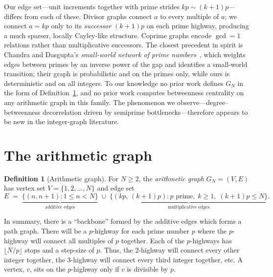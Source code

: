 \documentclass[11pt]{article}
\theoremstyle{plain}
\theoremstyle{definition}
\newtheorem{definition}[theorem]{Definition}
\begin{document}
Our edge set---unit increments together with prime strides $kp \sim (k+1)p$---differs from each of these.
Divisor graphs connect $a$ to every multiple of $a$; we connect $a = kp$ only to its
\emph{successor} $(k+1)p$ on each prime highway, producing a much sparser, locally Cayley-like structure.
Coprime graphs encode $\gcd = 1$ relations rather than multiplicative successors. The closest precedent in spirit
is Chandra and Dasgupta's \emph{small-world network of prime numbers}~\cite{ChandraDasgupta2005}, which weights edges between primes
by an inverse power of the gap and identifies a small-world transition; their graph is probabilistic and on
the primes only, while ours is deterministic and on all integers. To our knowledge no prior work
defines $G_N$ in the form of Definition~\ref{def:graph}, and no prior work computes betweenness centrality
on any arithmetic graph in this family. The phenomenon we observe---degree--betweenness decorrelation
driven by semiprime bottlenecks---therefore appears to be new in the integer-graph literature.

\section{The arithmetic graph}

\begin{definition}[Arithmetic graph]\label{def:graph}
For $N \ge 2$, the \emph{arithmetic graph} $G_N = (V, E)$ has vertex set
$V = \{1, 2, \ldots, N\}$ and edge set
\begin{equation}\label{eq:edgeset}
E \;=\; \underbrace{\{(n, n+1) : 1 \le n < N\}}_{\text{additive edges}}
\;\cup\;
\underbrace{\{(kp,\, (k+1)p) : p \text{ prime},\; k \ge 1,\; (k+1)p \le N\}}_{\text{multiplicative edges}}.
\end{equation}
\end{definition}

In summary, there is a ``backbone'' formed by the additive edges which forms a path graph. 
There will be a $p$-highway for each prime number $p$ where the $p$-highway will connect all multiples of $p$ together. 
Each of the $p$-highways has $\lfloor N/p \rfloor$ stops and a step-size of $p$. 
Thus, the $2$-highway will connect every other integer together, the $3$-highway will connect every third integer together, etc.
A vertex, $v$, sits on the $p$-highway only if $v$ is divisible by $p$.
\end{document}
